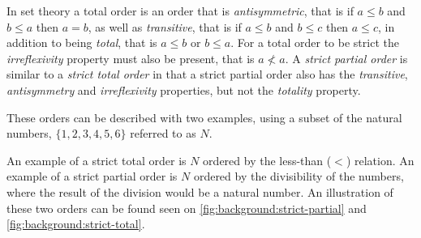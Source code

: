 		\newpar In set theory a total order is an order that is \textit{antisymmetric}, that is if $a \leq b$ and $b \leq a$ then $a = b$, as well as \textit{transitive}, that is if $a \leq b$ and $b \leq c$ then $a \leq c$, in addition to being \textit{total}, that is $a \leq b$ or $b \leq a$. For a total order to be strict the \textit{irreflexivity} property must also be present, that is $a \not< a$. A \textit{strict partial order} is similar to a \textit{strict total order} in that a strict partial order also has the \textit{transitive}, \textit{antisymmetry} and \textit{irreflexivity} properties, but not the \textit{totality} property.
		
		These orders can be described with two examples, using a subset of the natural numbers, $\{1, 2, 3, 4, 5, 6\}$ referred to as $N$. 
		
		An example of a strict total order is $N$ ordered by the less-than ($<$) relation. An example of a strict partial order is $N$ ordered by the divisibility of the numbers, where the result of the division would be a natural number. An illustration of these two orders can be found seen on \autoref{fig:background:strict-partial} and \autoref{fig:background:strict-total}.
	
